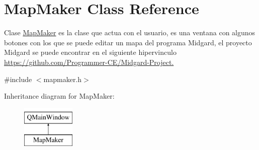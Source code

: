 \hypertarget{class_map_maker}{\section{Map\-Maker Class Reference}
\label{class_map_maker}
}


Clase \hyperlink{class_map_maker}{Map\-Maker} es la clase que actua con el usuario, es una ventana con algunos botones con los que se puede editar un mapa del programa Midgard, el proyecto Midgard se puede encontrar en el siguiente hipervinculo \hyperlink{}{https\-://github.\-com/\-Programmer-\/\-C\-E/\-Midgard-\/\-Project.} 




{\ttfamily \#include $<$mapmaker.\-h$>$}

Inheritance diagram for Map\-Maker\-:\begin{figure}[H]
\begin{center}
\leavevmode
\includegraphics[height=2.000000cm]{class_map_maker}
\end{center}
\end{figure}
